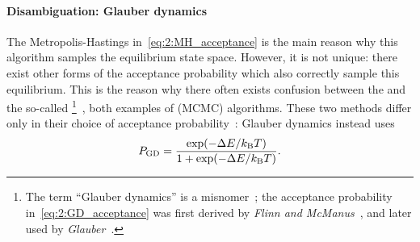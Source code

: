 \paragraph{Disambiguation: Glauber dynamics}
The Metropolis-Hastings  in~\cref{eq:2:MH_acceptance} is the main reason why this algorithm samples the equilibrium state space.
However, it is not unique: there exist other forms of the acceptance probability which also correctly sample this equilibrium.
This is the reason why there often exists confusion between the  and the so-called \footnote{
	The term ``Glauber dynamics'' is a misnomer~\cite{bit-player_MCvsGlauber}; the acceptance probability in~\cref{eq:2:GD_acceptance} was first derived by \textit{Flinn and McManus}~\cite{flinn1961TransitionProbability}, and later used by \textit{Glauber}~\cite{glauber1963time}.
}~\cite{flinn1961TransitionProbability,glauber1963time,flinn1974MCIsing}, both examples of  (MCMC) algorithms. %
These two methods differ only in their choice of acceptance probability~\cite{jang2004stochastic}: Glauber dynamics instead uses %
\begin{equation}
	\label{eq:2:GD_acceptance}
	P_\mathrm{GD} = \frac{\exp(-\Delta E / \kBT)}{1 + \exp(-\Delta E / \kBT)} \mathrm{.}
\end{equation}

